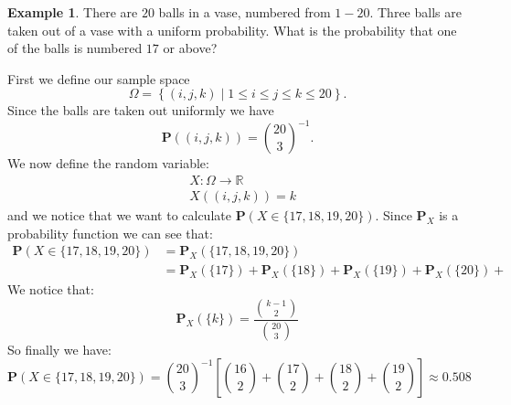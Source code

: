 \documentclass[11pt,a4paper]{article}
\theoremstyle{definition}
\newtheorem{example}{Example}[section]
\theoremstyle{plain}
\newcommand{\R}{\mathbb{R}}
\newcommand{\set}[2]{ \left\{ #1 \mid #2 \right\} }
\begin{document}
  \begin{example}
    There are $20$ balls in a vase, numbered from $1-20$.
    Three balls are taken out of a vase with a uniform probability.
    What is the probability that one of the balls is numbered $17$ or above?

    First we define our sample space
    \[
      \Omega = \set{(i,j,k)}{1 \le i \le j \le k \le 20}.
    \]
    Since the balls are taken out uniformly we have 
    \[ \mathbf P\left((i,j,k)\right) = {\binom{20}{3}}^{-1}. \]
    We now define the random variable:
    \begin{align*}
      &X \colon \Omega \to \R \\
      &X\left((i,j,k)\right) = k
    \end{align*}
    and we notice that we want to calculate 
    $\mathbf P\left(X \in \{17,18,19,20\}\right)$.
    Since $\mathbf P_X$ is a probability function we can see that:
    \begin{align*}
      \mathbf P\left(X \in \{17,18,19,20\}\right) &= 
      \mathbf P_X\left(\{17,18,19,20\}\right) \\ &=
      \mathbf P_X\left(\{17\}\right) + 
      \mathbf P_X\left(\{18\}\right) +
      \mathbf P_X\left(\{19\}\right) +
      \mathbf P_X\left(\{20\}\right) +
    \end{align*}
    We notice that:
    \[
      \mathbf P_X\left(\{k\}\right) = \frac{\binom{k-1}{2}}{\binom{20}{3}}
    \]
    So finally we have:
    \[
      \mathbf P\left(X \in \{17,18,19,20\}\right) = 
      {\binom{20}{3}}^{-1} 
      \left[
        \binom{16}{2} + \binom{17}{2} + \binom{18}{2} + \binom{19}{2}
      \right]
      \approx 0.508
    \]
  \end{example}
\end{document}
